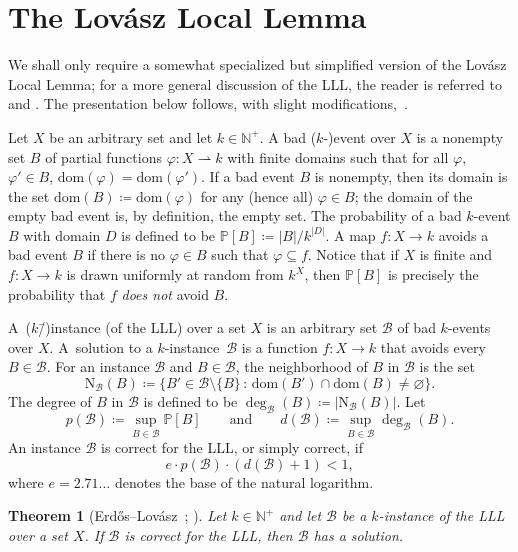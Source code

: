 \documentclass[11pt, reqno, psamsfonts]{amsart}
\theoremstyle{bfnote}
\newtheorem{theo}[equation]{Theorem}
\theoremstyle{claim}
\theoremstyle{definition}
\theoremstyle{remark}
\newcommand{\0}{\varnothing}
\newcommand{\set}[1]{\{#1\}}
\newcommand{\dom}{\mathrm{dom}}
\newcommand{\N}{{\mathbb{N}}}
\renewcommand{\phi}{\varphi}
\newcommand{\defeq}{\coloneqq}
\newcommand{\emphd}[1]{{\fontseries{b}\selectfont\textsf{#1}}}
\newcommand{\B}{{\mathscr{B}}}
\renewcommand{\P}{\mathbb{P}}
\newcommand{\Nbhd}{\mathrm{N}}
\newcommand{\bemph}[1]{{\normalfont#1}} %
\newcommand{\ep}[1]{\bemph{(}#1\bemph{)}} %
\numberwithin{equation}{section}
\begin{document}
	\section{The Lov\'asz Local Lemma}\label{sec:LLL}
	
	We shall only require a somewhat specialized but simplified version of the Lov\'asz Local Lemma; for a more general discussion of the LLL, the reader is referred to~\cite{AS} and \cite{MR}. The presentation below follows, with slight modifications,~\cite[\S{}1.2]{MLLL}.
	
	Let $X$ be an arbitrary set and let $k \in \N^+$. A \emphd{bad \ep{$k$-}event} over $X$ is a nonempty set $B$ of partial functions $\phi \colon X \rightharpoonup k$ with finite domains such that for all $\phi$, $\phi' \in B$, $\dom(\phi) = \dom(\phi')$. If a bad event $B$ is nonempty, then its \emphd{domain} is the set $\dom(B) \coloneqq \dom(\phi)$ for any \ep{hence all} $\phi \in B$; the domain of the empty bad event is, by definition, the empty set. The \emphd{probability} of a bad $k$-event $B$ with domain $D$ is defined to be $\P[B] \coloneqq |B|/k^{|D|}$. A map $f \colon X \to k$ \emphd{avoids} a bad event $B$ if there is no $\phi \in B$ such that $\phi \subseteq f$. Notice that if $X$ is finite and $f \colon X \to k$ is drawn uniformly at random from $k^X$, then $\P[B]$ is precisely the probability that $f$ \emph{does not} avoid $B$.
	
	A~\emphd{\ep{$k$\=/}instance \ep{of the LLL}} over a set $X$ is an arbitrary set $\B$ of bad $k$-events over $X$. A~\emphd{solution} to a $k$-instance~$\B$ is a function $f \colon X \to k$ that avoids every $B \in \B$. For an instance $\B$ and $B \in \B$, the \emphd{neighborhood} of $B$ in $\B$ is the set
	\[
	\Nbhd_\B(B) \defeq \set{B' \in \B \setminus \set{B} \,:\, \dom(B') \cap \dom(B) \neq \0}.
	\]
	The \emphd{degree} of $B$ in $\B$ is defined to be $\deg_\B(B) \defeq |\Nbhd_\B(B)|$. Let
	\[
	p(\B) \defeq \sup_{B \in \B} \P[B] \qquad \text{and} \qquad d(\B) \defeq \sup_{B \in \B} \deg_\B(B).
	\]
	An instance $\B$ is \emphd{correct for the LLL}, or simply \emphd{correct}, if
	\[
	e\cdot p(\B) \cdot (d(\B) + 1) < 1,
	\]
	where $e = 2.71\ldots${} denotes the base of the natural logarithm.
	
	\begin{theo}[{Erd\H os--Lov\'asz~\cite{EL}; }]\label{theo:LLL}
		Let $k \in \N^+$ and let $\B$ be a $k$-instance of the LLL over a set $X$. If $\B$ is correct for the LLL, then $\B$ has a solution.
	\end{theo}
	
\end{document}

